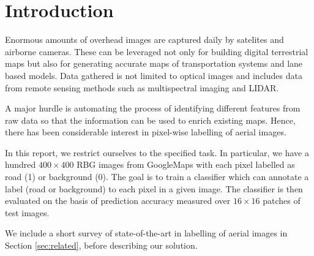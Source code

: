 \section{Introduction}

Enormous amounts of overhead images are captured daily by satelites and
airborne cameras. These can be leveraged not only for building digital
terrestrial maps but also for generating accurate maps of transportation
systems and lane based models. Data gathered is not limited to optical images
and includes data from remote sensing methods such as multispectral imaging and
LIDAR. 

A major hurdle is automating the process of identifying different features from
raw data so that the information can be used to enrich existing maps. Hence,
there has been considerable interest in pixel-wise labelling of aerial images.

In this report, we restrict ourselves to the specified task. In particular, we
have a hundred $400\times400$ RBG images from GoogleMaps with each pixel
labelled as road (1) or background (0). The goal is to train a classifier which
can annotate a label (road or background) to each pixel in a given image. The
classifier is then evaluated on the basis of prediction accuracy measured over
$16\times16$ patches of test images.

We include a short survey of state-of-the-art in labelling of aerial images in
Section \ref{sec:related}, before describing our solution.


